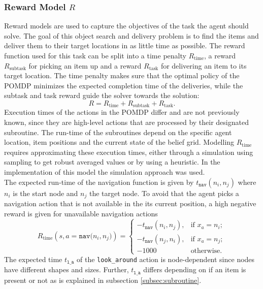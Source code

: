 \subsubsection{Reward Model $R$}
Reward models are used to capture the objectives of the task the agent should solve. The goal of this object search and delivery problem is to find the items and deliver them to their target locations in as little time as possible. The reward function used for this task can be split into a time penalty $R_\text{time}$, a reward  $R_\text{subtask}$ for picking an item up and a reward $R_\text{task}$ for delivering an item to its target location. The time penalty makes sure that the optimal policy of the POMDP minimizes the expected completion time of the deliveries, while the subtask and task reward guide the solver towards the solution:
\begin{equation}
    R = R_{\text{time}} + R_{\text{subtask}} + R_{\text{task}}.
\end{equation}
Execution times of the actions in the POMDP differ and are not previously known, since they are high-level actions that are processed by their designated subroutine. The run-time of the subroutines depend on the specific agent location, item positions and the current state of the belief grid. Modelling $R_\text{time}$ requires approximating these execution times, either through a simulation using sampling to get robust averaged values or by using a heuristic. In the implementation of this model the simulation approach was used.\\
The expected run-time of the navigation function is given by $t_\texttt{nav}(n_i, n_j)$ where $n_i$ is the start node and $n_j$ the target node. To avoid that the agent picks a navigation action that is not available in the its current position, a high negative reward is given for unavailable navigation actions
\begin{equation}
    R_\text{time}(s, a=\texttt{nav($n_i, n_j$)}) = \begin{cases}
    -t_\texttt{nav}(n_i, n_j), & \text{if } x_a=n_i;\\
    -t_\texttt{nav}(n_j, n_i), & \text{if } x_a=n_j;\\
    -1000 & \text{otherwise}.
    \end{cases}
\end{equation}
The expected time $t_\texttt{l\_a}$ of the \texttt{look\_around} action is node-dependent since nodes have different shapes and sizes. Further, $t_\texttt{l\_a}$ differs depending on if an item is present or not as is explained in subsection \ref{subsec:subroutine}. 
